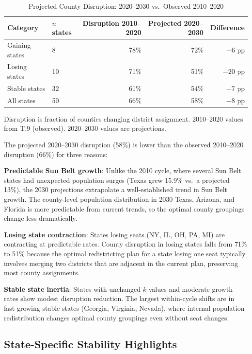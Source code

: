 \begin{table}[ht]
\centering
\caption{Projected County Disruption: 2020--2030 vs.\ Observed 2010--2020}
\label{tab:disruption}
\begin{tabular}{llrrr}
\toprule
Category & $n$ states & Disruption 2010--2020 & Projected 2020--2030 & Difference \\
\midrule
Gaining states & 8 & 78\% & 72\% & $-6$ pp \\
Losing states & 10 & 71\% & 51\% & $-20$ pp \\
Stable states & 32 & 61\% & 54\% & $-7$ pp \\
\midrule
All states & 50 & 66\% & 58\% & $-8$ pp \\
\bottomrule
\end{tabular}
\begin{tablenotes}
\small
\item Disruption is fraction of counties changing district assignment.
  2010--2020 values from T.9 (observed). 2020--2030 values are projections.
\end{tablenotes}
\end{table}

The projected 2020--2030 disruption (58\%) is lower than the observed 2010--2020
disruption (66\%) for three reasons:

\textbf{Predictable Sun Belt growth}: Unlike the 2010 cycle, where several Sun Belt
states had unexpected population surges (Texas grew 15.9\% vs.\ a projected 13\%),
the 2030 projections extrapolate a well-established trend in Sun Belt growth. The
county-level population distribution in 2030 Texas, Arizona, and Florida is more
predictable from current trends, so the optimal county groupings change less
dramatically.

\textbf{Losing state contraction}: States losing seats (NY, IL, OH, PA, MI) are
contracting at predictable rates. County disruption in losing states falls from 71\%
to 51\% because the optimal redistricting plan for a state losing one seat typically
involves merging two districts that are adjacent in the current plan, preserving most
county assignments.

\textbf{Stable state inertia}: States with unchanged $k$-values and moderate growth
rates show modest disruption reduction. The largest within-cycle shifts are in
fast-growing stable states (Georgia, Virginia, Nevada), where internal population
redistribution changes optimal county groupings even without seat changes.

\subsection{State-Specific Stability Highlights}

